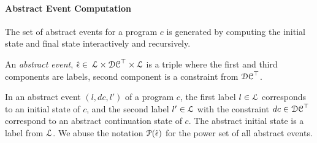  \paragraph{Abstract Event Computation} 
 The set of abstract events for a program $c$ is generated by computing the initial state and final state interactively and recursively.
 \begin{defn}
 \label{def:adaptfun-abs_event}
 An \emph{abstract event},
 $\hat{\mathtt{\epsilon}{}} \in $
 $\mathcal{L} \times \mathcal{DC}^{\top} \times \mathcal{L}$
 is a 
 triple where the first and third components are labels,
 second component is a constraint from $\mathcal{DC}^{\top}$.
 \end{defn}
 In an abstract event $(l, dc, l')$ of a program $c$, 
 the first label $l \in \mathcal{L}$ corresponds to an initial state of $c$, and 
 the second label $l' \in \mathcal{L}$ with the constraint $dc \in \mathcal{DC}^{\top}$ correspond to an abstract continuation state of $c$.
 The abstract initial state is a label from $\mathcal{L}$.
We abuse the notation $\mathcal{P}(\hat{\mathtt{\epsilon}{}})$ for the power set of all abstract events.

